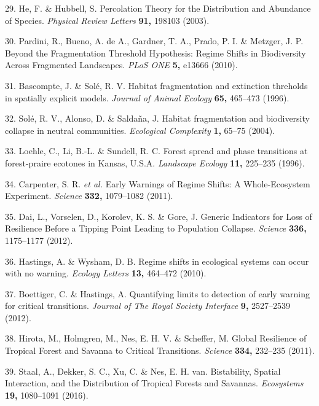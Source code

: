 \documentclass[]{article}
\begin{document}
\hypertarget{ref-He2003}{}
29. He, F. \& Hubbell, S. Percolation Theory for the Distribution and
Abundance of Species. \emph{Physical Review Letters} \textbf{91,} 198103
(2003).

\hypertarget{ref-Pardini2010}{}
30. Pardini, R., Bueno, A. de A., Gardner, T. A., Prado, P. I. \&
Metzger, J. P. Beyond the Fragmentation Threshold Hypothesis: Regime
Shifts in Biodiversity Across Fragmented Landscapes. \emph{PLoS ONE}
\textbf{5,} e13666 (2010).

\hypertarget{ref-Bascompte1996}{}
31. Bascompte, J. \& Solé, R. V. Habitat fragmentation and extinction
threholds in spatially explicit models. \emph{Journal of Animal Ecology}
\textbf{65,} 465--473 (1996).

\hypertarget{ref-Sole2004}{}
32. Solé, R. V., Alonso, D. \& Saldaña, J. Habitat fragmentation and
biodiversity collapse in neutral communities. \emph{Ecological
Complexity} \textbf{1,} 65--75 (2004).

\hypertarget{ref-Loehle1996b}{}
33. Loehle, C., Li, B.-L. \& Sundell, R. C. Forest spread and phase
transitions at forest-praire ecotones in Kansas, U.S.A. \emph{Landscape
Ecology} \textbf{11,} 225--235 (1996).

\hypertarget{ref-Carpenter2011}{}
34. Carpenter, S. R. \emph{et al.} Early Warnings of Regime Shifts: A
Whole-Ecosystem Experiment. \emph{Science} \textbf{332,} 1079--1082
(2011).

\hypertarget{ref-Dai2012}{}
35. Dai, L., Vorselen, D., Korolev, K. S. \& Gore, J. Generic Indicators
for Loss of Resilience Before a Tipping Point Leading to Population
Collapse. \emph{Science} \textbf{336,} 1175--1177 (2012).

\hypertarget{ref-Hastings2010b}{}
36. Hastings, A. \& Wysham, D. B. Regime shifts in ecological systems
can occur with no warning. \emph{Ecology Letters} \textbf{13,} 464--472
(2010).

\hypertarget{ref-Boettiger2012}{}
37. Boettiger, C. \& Hastings, A. Quantifying limits to detection of
early warning for critical transitions. \emph{Journal of The Royal
Society Interface} \textbf{9,} 2527--2539 (2012).

\hypertarget{ref-Hirota2011}{}
38. Hirota, M., Holmgren, M., Nes, E. H. V. \& Scheffer, M. Global
Resilience of Tropical Forest and Savanna to Critical Transitions.
\emph{Science} \textbf{334,} 232--235 (2011).

\hypertarget{ref-Staal2016}{}
39. Staal, A., Dekker, S. C., Xu, C. \& Nes, E. H. van. Bistability,
Spatial Interaction, and the Distribution of Tropical Forests and
Savannas. \emph{Ecosystems} \textbf{19,} 1080--1091 (2016).
\end{document}

